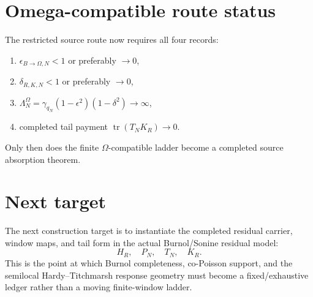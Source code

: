 \documentclass[11pt]{article}
\begin{document}
\section{Omega-compatible route status}
The restricted source route now requires all four records:
\begin{enumerate}
\item \(\epsilon_{B\to\Omega,N}<1\) or preferably \(\to0\),
\item \(\delta_{R,K,N}<1\) or preferably \(\to0\),
\item \(\Lambda_N^\Omega=\gamma_{q_N}(1-\epsilon^2)(1-\delta^2)\to\infty\),
\item completed tail payment \(\operatorname{tr}(T_NK_R)\to0\).
\end{enumerate}
Only then does the finite \(\Omega\)-compatible ladder become a completed source absorption theorem.

\section{Next target}
The next construction target is to instantiate the completed residual carrier, window maps, and tail form in the actual Burnol/Sonine residual model:
\[
H_R,
\quad
P_N,
\quad
T_N,
\quad
K_R.
\]
This is the point at which Burnol completeness, co-Poisson support, and the semilocal Hardy--Titchmarsh response geometry must become a fixed/exhaustive ledger rather than a moving finite-window ladder.
\end{document}
